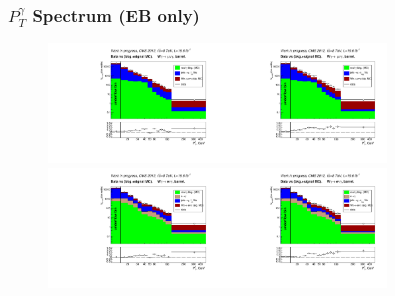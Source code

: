 \begin{frame}
\end{frame}%

\begin{frame}\frametitle{\footnotesize{$P_T^{\gamma}$ Spectrum (EB only)}}
   \begin{figure}[htb]
    \begin{center}
       \includegraphics[width=0.40\textwidth]{../figs/figs_v11/MUON_WGamma/PrepareYields/c_DATAvsBkgPlusSigMCc_MUON_WGamma_TEMPL_CHISO_UNblind__Barrel__phoEt.pdf}\includegraphics[width=0.40\textwidth]{../figs/figs_v11/MUON_WGamma/PrepareYields/c_DATAvsBkgPlusSigMCc_MUON_WGamma_TEMPL_SIHIH_UNblind__Barrel__phoEt.pdf}\\
       \includegraphics[width=0.40\textwidth]{../figs/figs_v11/ELECTRON_WGamma/PrepareYields/c_DATAvsBkgPlusSigMCc_ELECTRON_WGamma_TEMPL_CHISO_UNblind__Barrel__phoEt.pdf}\includegraphics[width=0.40\textwidth]{../figs/figs_v11/ELECTRON_WGamma/PrepareYields/c_DATAvsBkgPlusSigMCc_ELECTRON_WGamma_TEMPL_SIHIH_UNblind__Barrel__phoEt.pdf}\\
    \end{center}
  \end{figure}
\end{frame}%

